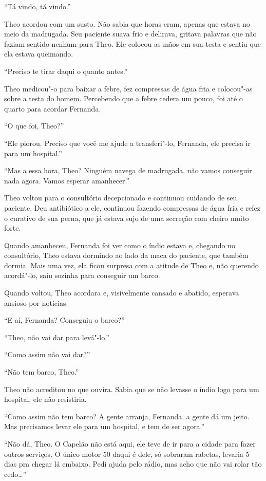 \asterisc


``Tá vindo, tá vindo.''

Theo acordou com um susto. Não sabia que horas eram, apenas que estava
no meio da madrugada. Seu paciente suava frio e delirava, gritava
palavras que não faziam sentido nenhum para Theo. Ele colocou as mãos em
sua testa e sentiu que ela estava queimando.

``Preciso te tirar daqui o quanto antes.''

Theo medicou"-o para baixar a febre, fez compressas de água fria e
colocou"-as sobre a testa do homem. Percebendo que a febre cedera um
pouco, foi até o quarto para acordar Fernanda.

``O que foi, Theo?''

``Ele piorou. Preciso que você me ajude a transferi"-lo, Fernanda, ele
precisa ir para um hospital.''

``Mas a essa hora, Theo? Ninguém navega de madrugada, não vamos
conseguir nada agora. Vamos esperar amanhecer.''

Theo voltou para o consultório decepcionado e continuou cuidando de seu
paciente. Deu antibiótico a ele, continuou fazendo compressas de água
fria e refez o curativo de sua perna, que já estava sujo
de uma secreção com cheiro muito forte.

Quando amanheceu, Fernanda foi ver como o índio estava e, chegando no
consultório, Theo estava dormindo ao lado da maca do paciente, que
também dormia. Mais uma vez, ela ficou surpresa com a atitude de Theo e,
não querendo acordá"-lo, saiu sozinha para conseguir um barco.

Quando voltou, Theo acordara e, visivelmente cansado e abatido, esperava
ansioso por notícias.

``E aí, Fernanda? Conseguiu o barco?''

``Theo, não vai dar para levá"-lo.''

``Como assim não vai dar?''

``Não tem barco, Theo.''

Theo não acreditou no que ouvira. Sabia que se não levasse o índio logo
para um hospital, ele não resistiria.

``Como assim não tem barco? A gente arranja, Fernanda, a gente dá um
jeito. Mas precisamos levar ele para um hospital, e tem de ser agora.''

``Não dá, Theo. O Capelão não está aqui, ele teve de ir para a cidade
para fazer outros serviços. O único motor 50 daqui é dele, só sobraram
rabetas, levaria 5 dias pra chegar lá embaixo. Pedi ajuda pelo rádio,
mas acho que não vai rolar tão cedo\ldots{}''

